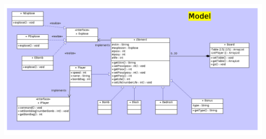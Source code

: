         \begin{center}
		\includegraphics[scale=0.35]{ch1/Model}
 	 	\label{fig:DiagModel}
        \end{center}
        
        
        
        
        
        
        
        
        
        
        
        
        
        
        
        
        
        
        
        
        
        
        
        
        
        
        
        
        
        
		
	